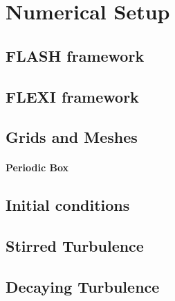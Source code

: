 \section{Numerical Setup}

\subsection{FLASH framework}
\subsection{FLEXI framework}

\subsection{Grids and Meshes}
\paragraph{Periodic Box}

\subsection{Initial conditions}

\subsection{Stirred Turbulence}
\subsection{Decaying Turbulence}
